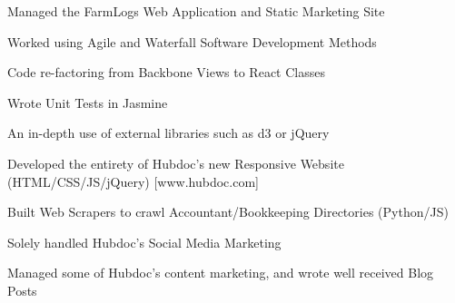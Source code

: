 \documentclass[letterpaper]{deedy-resume} %
\begin{document}

\newpage %

\begin{minipage}[t]{0.33\textwidth} %

\end{minipage} %
\hfill
\begin{minipage}[t]{0.66\textwidth} %


\begin{tightitemize}
\item Managed the FarmLogs Web Application and Static Marketing Site
\item Worked using Agile and Waterfall Software Development Methods
\item Code re-factoring from Backbone Views to React Classes
\item Wrote Unit Tests in Jasmine
\item An in-depth use of external libraries such as d3 or jQuery
\end{tightitemize}

\sectionspace %


\begin{tightitemize}
\item Developed the entirety of Hubdoc's new Responsive Website (HTML/CSS/JS/jQuery) [www.hubdoc.com]
\item Built Web Scrapers to crawl Accountant/Bookkeeping Directories (Python/JS)
\item Solely handled Hubdoc's Social Media Marketing
\item Managed some of Hubdoc's content marketing, and wrote well received Blog Posts
\end{tightitemize}

\sectionspace %



\end{minipage}
\end{document}
